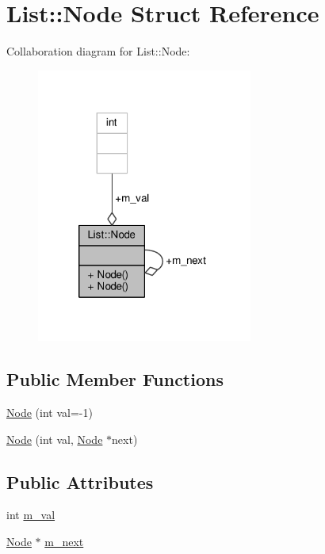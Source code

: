 \hypertarget{structList_1_1Node}{\section{List\-:\-:Node Struct Reference}
\label{structList_1_1Node}
}


Collaboration diagram for List\-:\-:Node\-:
\nopagebreak
\begin{figure}[H]
\begin{center}
\leavevmode
\includegraphics[width=201pt]{structList_1_1Node__coll__graph}
\end{center}
\end{figure}
\subsection*{Public Member Functions}
\begin{DoxyCompactItemize}
\item 
\hyperlink{structList_1_1Node_ae08c42e10507757aeb0041e29c7b1c6c}{Node} (int val=-\/1)
\item 
\hyperlink{structList_1_1Node_ad205cce13a491e582fdd4018d86532df}{Node} (int val, \hyperlink{structList_1_1Node}{Node} $\ast$next)
\end{DoxyCompactItemize}
\subsection*{Public Attributes}
\begin{DoxyCompactItemize}
\item 
int \hyperlink{structList_1_1Node_a8bb0ed01a438a3ce259ce1a8a550f815}{m\-\_\-val}
\item 
\hyperlink{structList_1_1Node}{Node} $\ast$ \hyperlink{structList_1_1Node_a61d4ac937ffcb92c759597582becadab}{m\-\_\-next}
\end{DoxyCompactItemize}


